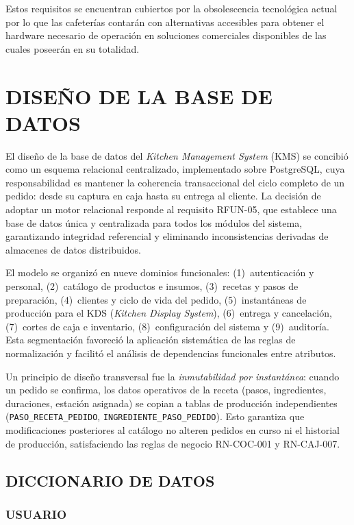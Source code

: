 Estos requisitos se encuentran cubiertos por la obsolescencia tecnológica actual por lo que las cafeterías contarán con alternativas accesibles para obtener el hardware necesario de operación en soluciones comerciales disponibles de las cuales poseerán en su totalidad. 

\section{DISEÑO DE LA BASE DE DATOS}
El diseño de la base de datos del \textit{Kitchen Management System} (KMS) se concibió como un esquema relacional centralizado, implementado sobre PostgreSQL, cuya responsabilidad es mantener la coherencia transaccional del ciclo completo de un pedido: desde su captura en caja hasta su entrega al cliente. La decisión de adoptar un motor relacional responde al requisito RFUN-05, que establece una base de datos única y centralizada para todos los módulos del sistema, garantizando integridad referencial y eliminando inconsistencias derivadas de almacenes de datos distribuidos.

El modelo se organizó en nueve dominios funcionales: (1)~autenticación y personal, (2)~catálogo de productos e insumos, (3)~recetas y pasos de preparación, (4)~clientes y ciclo de vida del pedido, (5)~instantáneas de producción para el KDS (\textit{Kitchen Display System}), (6)~entrega y cancelación, (7)~cortes de caja e inventario, (8)~configuración del sistema y (9)~auditoría. Esta segmentación favoreció la aplicación sistemática de las reglas de normalización y facilitó el análisis de dependencias funcionales entre atributos.

Un principio de diseño transversal fue la \textit{inmutabilidad por instantánea}: cuando un pedido se confirma, los datos operativos de la receta (pasos, ingredientes, duraciones, estación asignada) se copian a tablas de producción independientes (\texttt{PASO\_RECETA\_PEDIDO}, \texttt{INGREDIENTE\_PASO\_PEDIDO}). Esto garantiza que modificaciones posteriores al catálogo no alteren pedidos en curso ni el historial de producción, satisfaciendo las reglas de negocio RN-COC-001 y RN-CAJ-007.

\subsection{DICCIONARIO DE DATOS}
\subsubsection{USUARIO}
\begingroup
\setlength{\LTleft}{\fill}
\setlength{\LTright}{\fill}


